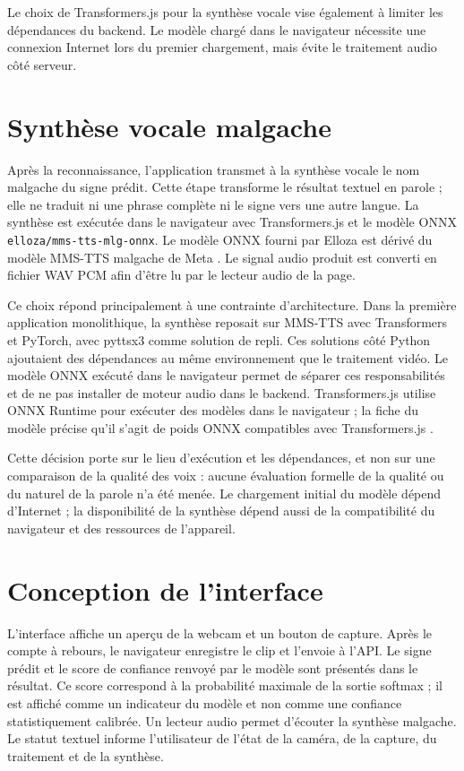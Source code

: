 Le choix de Transformers.js pour la synthèse vocale vise également à limiter les dépendances du backend. Le modèle chargé dans le navigateur nécessite une connexion Internet lors du premier chargement, mais évite le traitement audio côté serveur.

\section{Synthèse vocale malgache}

Après la reconnaissance, l'application transmet à la synthèse vocale le nom malgache du signe prédit. Cette étape transforme le résultat textuel en parole ; elle ne traduit ni une phrase complète ni le signe vers une autre langue. La synthèse est exécutée dans le navigateur avec Transformers.js et le modèle ONNX \texttt{elloza/mms-tts-mlg-onnx}. Le modèle ONNX fourni par Elloza est dérivé du modèle MMS-TTS malgache de Meta . Le signal audio produit est converti en fichier WAV PCM afin d'être lu par le lecteur audio de la page.

Ce choix répond principalement à une contrainte d'architecture. Dans la première application monolithique, la synthèse reposait sur MMS-TTS avec Transformers et PyTorch, avec pyttsx3 comme solution de repli. Ces solutions côté Python ajoutaient des dépendances au même environnement que le traitement vidéo. Le modèle ONNX exécuté dans le navigateur permet de séparer ces responsabilités et de ne pas installer de moteur audio dans le backend. Transformers.js utilise ONNX Runtime pour exécuter des modèles dans le navigateur ; la fiche du modèle précise qu'il s'agit de poids ONNX compatibles avec Transformers.js .

Cette décision porte sur le lieu d'exécution et les dépendances, et non sur une comparaison de la qualité des voix : aucune évaluation formelle de la qualité ou du naturel de la parole n'a été menée. Le chargement initial du modèle dépend d'Internet ; la disponibilité de la synthèse dépend aussi de la compatibilité du navigateur et des ressources de l'appareil.

\section{Conception de l'interface}

L'interface affiche un aperçu de la webcam et un bouton de capture. Après le compte à rebours, le navigateur enregistre le clip et l'envoie à l'API. Le signe prédit et le score de confiance renvoyé par le modèle sont présentés dans le résultat. Ce score correspond à la probabilité maximale de la sortie softmax ; il est affiché comme un indicateur du modèle et non comme une confiance statistiquement calibrée. Un lecteur audio permet d'écouter la synthèse malgache. Le statut textuel informe l'utilisateur de l'état de la caméra, de la capture, du traitement et de la synthèse.


